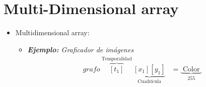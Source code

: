 
\section{Multi-Dimensional array}
\begin{itemize}
    \item Multidimensional array:
    \begin{itemize}
        \item \emph{\textbf{Ejemplo: }Graficador de imágenes}
            \begin{align*}
                grafo \overbrace{[t_1]}^{\text{  Temporalidad  }}\underbrace{[x_1][y_1]}_{\text{  Cuadrícula  }} & = \underbrace{\text{  Color  }}_{255}\\ 
            \end{align*}
        

\end{itemize}
\end{itemize}
